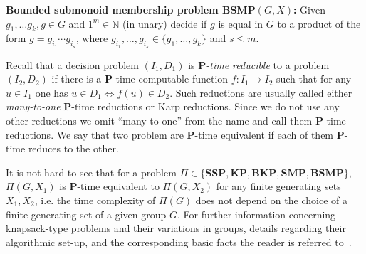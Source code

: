 \documentclass[10pt]{amsart}
\theoremstyle{definition}
\def\P{{\mathbf{P}}}
\def\SSP{{\mathbf{SSP}}}
\def\SMP{{\mathbf{SMP}}}
\def\BSMP{{\mathbf{BSMP}}}
\def\BKP{{\mathbf{BKP}}}
\def\KP{{\mathbf{KP}}}
\begin{document}
\medskip \noindent
{\bf Bounded submonoid membership problem $\BSMP(G,X)$\index{$\BSMP(G,X)$}:}
Given $g_1, \ldots g_k, g \in G$ and $1^m \in \mathbb{N}$ (in unary)
decide if $g$ is equal in $G$ to a product of the form
$g=g_{i_1}\cdots g_{i_s}$, where $g_{i_1}, \ldots, g_{i_s} \in \{g_1, \ldots, g_k\}$ and  $s\le m$.




\medskip
Recall that a decision problem $(I_1,D_1)$ is  {\em $\P$-time  reducible}
to  a problem $(I_2,D_2)$ if there is a $\P$-time computable function
$f:I_1  \to I_2$  such that for any $u \in I_1$ one has $u \in D_1 \Longleftrightarrow f(u) \in D_2$.
Such reductions are usually called either {\em many-to-one} $\P$-time reductions or Karp reductions.
Since we do not use any other reductions we omit ``many-to-one'' from the name and call them $\P$-time reductions. We say that two problem are $\P$-time equivalent if each of them $\P$-time reduces to the other.

It is not hard to see that for a problem $\Pi\in \{\SSP, \KP, \BKP, \SMP, \BSMP\}$, $\Pi(G,X_1)$ is $\P$-time equivalent to $\Pi(G,X_2)$ for any finite generating sets $X_1,X_2$, i.e. the time complexity of $\Pi(G)$ does not depend on the choice of a finite generating set of a given group $G$.
For further information concerning knapsack-type problems and their variations in groups, details regarding their algorithmic set-up, and the corresponding basic facts the reader is referred to~\cite{MNU1}.
\end{document}
